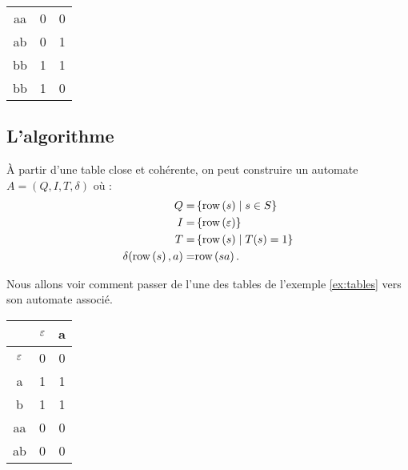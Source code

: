 \begin{exemple}
\begin{itemize}
\begin{center}
\begin{tabular}{c|c|c}
				      aa         & 0          & 0 \\
				      ab         & 0          & 1 \\
				      bb         & 1          & 1 \\
				      bb         & 1          & 0 \\
			      \end{tabular}
		      \end{center}
	\end{itemize}
\end{exemple}


\subsection{L'algorithme}

\begin{theorem}\label{thm:automata-tables}
	À partir d'une table close et cohérente, on peut construire un automate $A = (Q, I, T, \delta)$ où :
	$$
		\begin{aligned}
			Q                   = & \left\{ \text{row}\left(s\right) \mid s \in S \right\}  \\
			I                   = & \left\{ \text{row}\left(\varepsilon\right) \right\}        \\
			T                   = & \left\{ \text{row}\left(s\right)  \mid T(s) = 1 \right\} \\
			\delta(\text{row}\left(s\right), a)  = & \text{row}\left(sa\right).
		\end{aligned}
	$$
\end{theorem}

\begin{exemple}
	Nous allons voir comment passer de l'une des tables de l'exemple \ref{ex:tables} vers son automate associé.\\
	\begin{minipage}{0.5\textwidth}
		\centering
		\begin{tabular}{c|c|c}
			           & $\varepsilon$ & a \\ \hline
			$\varepsilon$ & 0          & 0 \\
			a          & 1          & 1 \\ \hline

			b          & 1          & 1 \\
			aa         & 0          & 0 \\
			ab         & 0          & 0 \\
		\end{tabular}
	\end{minipage}
	\begin{minipage}{0.5\textwidth}
		\centering
	\end{minipage}
\end{exemple}

